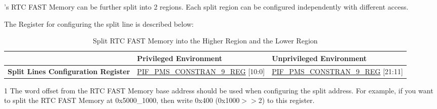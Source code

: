 \documentclass[main\_\_EN.tex]{subfiles}
\begin{document}
\chipname{}'s RTC FAST Memory can be further split into 2 regions. Each split region can be configured independently with different access.

The Register for configuring the split line is described below:

\begin{table}[H]
    \centering
    \caption{Split RTC FAST Memory into the Higher Region and the Lower Region}
    \label{tab:rtc_fast_mem_split}
    \begin{threeparttable}
    \begin{tabular}{|l|l|l|} \hline
    \rowcolor{lightgray}
     & \textbf{Privileged Environment} & \textbf{Unprivileged Environment} \\\hline
    \textbf{Split Lines Configuration Register}\tnote{1} & \hyperref[regdesc:PMSCORE0PIFPMSCONSTRAIN9REG]{PIF\_PMS\_CONSTRAN\_9\_REG} [10:0]  & \hyperref[regdesc:PMSCORE0PIFPMSCONSTRAIN9REG]{PIF\_PMS\_CONSTRAN\_9\_REG} [21:11] \\\hline
    \end{tabular}
        \begin{tablenotes}
        \item[1] The word offset from the RTC FAST Memory base address should be used when configuring the split address. For example, if you want to split the RTC FAST Memory at 0x5000\_1000, then write 0x400 (0x1000$>>$2) to this register.
        \end{tablenotes}
    \end{threeparttable}
\end{table}
\end{document}
